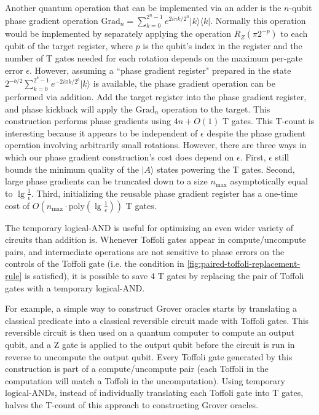 \documentclass[twocolumn]{revtex4-1}
\begin{document}
Another quantum operation that can be implemented via an adder is the $n$-qubit phase gradient operation $\text{Grad}_n = \sum_{k=0}^{2^n-1} e^{2 i \pi k / 2^n} |k\rangle \langle k|$.
Normally this operation would be implemented by separately applying the operation $R_Z(\pi 2^{-p})$ to each qubit of the target register, where $p$ is the qubit's index in the register and the number of T gates needed for each rotation depends on the maximum per-gate error $\epsilon$.
However, assuming a ``phase gradient register" prepared in the state $2^{-b/2} \sum_{k=0}^{2^b-1} e^{-2 i \pi k / 2^b} |k\rangle$ is available, the phase gradient operation can be performed via addition.
Add the target register into the phase gradient register, and phase kickback will apply the $\text{Grad}_n$ operation to the target.
This construction performs phase gradients using $4n + O(1)$ T gates.
This T-count is interesting because it appears to be independent of $\epsilon$ despite the phase gradient operation involving arbitrarily small rotations.
However, there are three ways in which our phase gradient construction's cost does depend on $\epsilon$.
First, $\epsilon$ still bounds the minimum quality of the $|A\rangle$ states powering the T gates.
Second, large phase gradients can be truncated down to a size $n_{\text{max}}$ asymptotically equal to $\lg \frac{1}{\epsilon}$.
Third, initializing the reusable phase gradient register has a one-time cost of $O(n_{\text{max}} \cdot \text{poly}(\lg \frac{1}{\epsilon}))$ T gates.


The temporary logical-AND is useful for optimizing an even wider variety of circuits than addition is.
Whenever Toffoli gates appear in compute/uncompute pairs, and intermediate operations are not sensitive to phase errors on the controls of the Toffoli gate (i.e. the condition in \autoref{fig:paired-toffoli-replacement-rule} is satisfied), it is possible to save 4 T gates by replacing the pair of Toffoli gates with a temporary logical-AND.


For example, a simple way to construct Grover oracles starts by translating a classical predicate into a classical reversible circuit made with Toffoli gates.
This reversible circuit is then used on a quantum computer to compute an output qubit, and a Z gate is applied to the output qubit before the circuit is run in reverse to uncompute the output qubit.
Every Toffoli gate generated by this construction is part of a compute/uncompute pair (each Toffoli in the computation will match a Toffoli in the uncomputation).
Using temporary logical-ANDs, instead of individually translating each Toffoli gate into T gates, halves the T-count of this approach to constructing Grover oracles.
\end{document}
